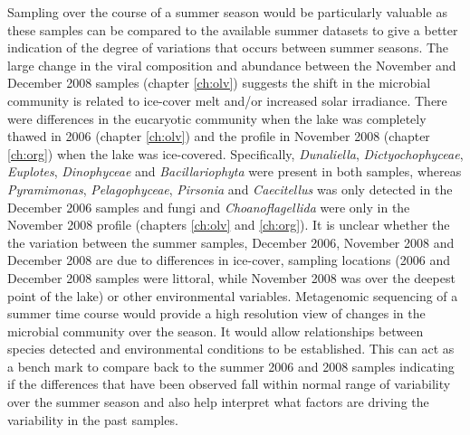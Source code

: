 
Sampling over the course of a summer season would be particularly valuable as these samples can be compared to the available summer datasets to give a better indication of the degree of variations that occurs between summer seasons.
The large change in the viral composition and abundance between the November and December 2008 samples (chapter \ref{ch:olv}) suggests the shift in the microbial community is related to ice-cover melt and/or increased solar irradiance. 
There were differences in the eucaryotic community when the lake was completely thawed in 2006 (chapter \ref{ch:olv}) and the profile in November 2008 (chapter \ref{ch:org}) when the lake was ice-covered.
Specifically, \emph{Dunaliella}, \emph{Dictyochophyceae}, \emph{Euplotes}, \emph{Dinophyceae} and \emph{Bacillariophyta} were present in both samples, whereas \emph{Pyramimonas}, \emph{Pelagophyceae}, \emph{Pirsonia} and \emph{Caecitellus} was only detected in the December 2006 samples and fungi and \emph{Choanoflagellida} were only in the November 2008 profile (chapters \ref{ch:olv} and \ref{ch:org}).
It is unclear whether the the variation between the summer samples, December 2006, November 2008 and December 2008 are due to differences in ice-cover, sampling locations  (2006 and December 2008 samples were littoral, while November 2008 was over the deepest point of the lake) or other environmental variables.
Metagenomic sequencing of a summer time course would provide a high resolution view of changes in the microbial community over the season.
It would allow relationships between species detected and environmental conditions to be established.
This can act as a bench mark to compare back to the summer 2006 and 2008 samples indicating if the differences that have been observed fall within normal range of variability over the summer season and also help interpret what factors are driving the variability in the past samples.

